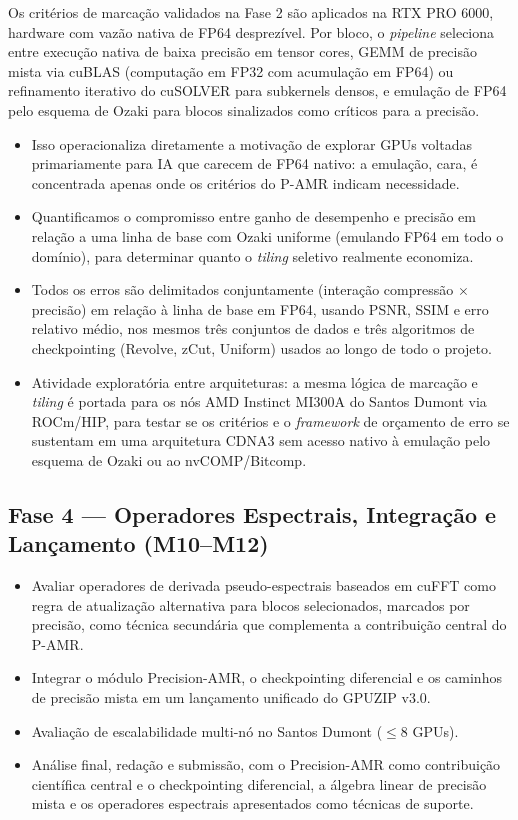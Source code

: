 \documentclass[12pt,a4paper]{article}
\newcommand{\pamr}{P\nobreakdash-AMR}
\begin{document}
Os critérios de marcação validados na Fase 2 são aplicados na RTX PRO 6000,
hardware com vazão nativa de FP64 desprezível. Por bloco, o \emph{pipeline}
seleciona entre execução nativa de baixa precisão em tensor cores, GEMM de
precisão mista via cuBLAS (computação em FP32 com acumulação em FP64) ou
refinamento iterativo do cuSOLVER para subkernels densos, e emulação de FP64
pelo esquema de Ozaki para blocos sinalizados como críticos para a precisão.

\begin{itemize}
  \item Isso operacionaliza diretamente a motivação de explorar GPUs
        voltadas primariamente para IA que carecem de FP64 nativo: a
        emulação, cara, é concentrada apenas onde os critérios do \pamr{}
        indicam necessidade.
  \item Quantificamos o compromisso entre ganho de desempenho e precisão em
        relação a uma linha de base com Ozaki uniforme (emulando FP64 em todo
        o domínio), para determinar quanto o \emph{tiling} seletivo realmente
        economiza.
  \item Todos os erros são delimitados conjuntamente (interação
        compressão $\times$ precisão) em relação à linha de base em FP64,
        usando PSNR, SSIM e erro relativo médio, nos mesmos três conjuntos de
        dados e três algoritmos de checkpointing (Revolve, zCut, Uniform)
        usados ao longo de todo o projeto.
  \item Atividade exploratória entre arquiteturas: a mesma lógica de marcação
        e \emph{tiling} é portada para os nós AMD Instinct MI300A do Santos
        Dumont via ROCm/HIP, para testar se os critérios e o \emph{framework}
        de orçamento de erro se sustentam em uma arquitetura CDNA3 sem acesso
        nativo à emulação pelo esquema de Ozaki ou ao nvCOMP/Bitcomp.
\end{itemize}

\subsection{Fase 4 --- Operadores Espectrais, Integração e Lançamento
(M10--M12)}

\begin{itemize}
  \item Avaliar operadores de derivada pseudo-espectrais baseados em cuFFT
        como regra de atualização alternativa para blocos selecionados,
        marcados por precisão, como técnica secundária que complementa a
        contribuição central do \pamr{}.
  \item Integrar o módulo Precision-AMR, o checkpointing diferencial e os
        caminhos de precisão mista em um lançamento unificado do GPUZIP v3.0.
  \item Avaliação de escalabilidade multi-nó no Santos Dumont
        ($\leq$8 GPUs).
  \item Análise final, redação e submissão, com o Precision-AMR como
        contribuição científica central e o checkpointing diferencial, a
        álgebra linear de precisão mista e os operadores espectrais
        apresentados como técnicas de suporte.
\end{itemize}
\end{document}
